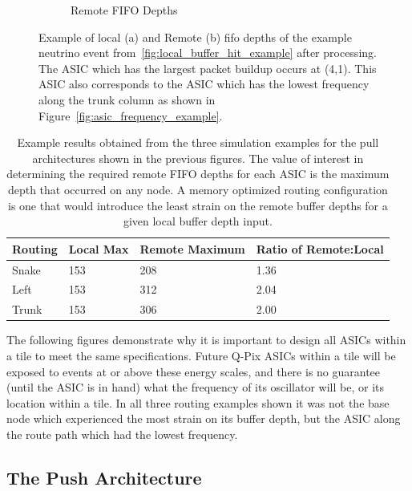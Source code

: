 \begin{figure}
\begin{subfigure}{.5\textwidth}
  \caption{Remote FIFO Depths}
\end{subfigure}
\caption{Example of local (a) and Remote (b) fifo depths of the example neutrino event from~\ref{fig:local_buffer_hit_example} after processing.
The ASIC which has the largest packet buildup occurs at (4,1).
This ASIC also corresponds to the ASIC which has the lowest frequency along the trunk column as shown in Figure~\ref{fig:asic_frequency_example}.
}
\label{fig:trunk_example_neutrino}
\end{figure}


\begin{table}
\begin{center}
\begin{tabular}{|| p{20mm} | p{40mm} | p{40mm} | p{45mm} ||}
 \hline
 Routing & Local Max & Remote Maximum & Ratio of Remote:Local \\ [0.5ex]
 \hline\hline
  Snake & 153 & 208 & 1.36 \\
 \hline
  Left & 153 & 312 & 2.04 \\
 \hline
  Trunk & 153 & 306 & 2.00 \\
 \hline
 \hline
\end{tabular}
\caption{Example results obtained from the three simulation examples for the pull architectures shown in the previous figures.
The value of interest in determining the required remote FIFO depths for each ASIC is the maximum depth that occurred on any node.
A memory optimized routing configuration is one that would introduce the least strain on the remote buffer depths for a given local buffer depth input.
}
\label{table:example_analysis}
\end{center}
\end{table}

The following figures demonstrate why it is important to design all ASICs within a tile to meet the same specifications.
Future Q-Pix ASICs within a tile will be exposed to events at or above these energy scales, and there is no guarantee (until the ASIC is in hand) what the frequency of its oscillator will be, or its location within a tile. 
In all three routing examples shown it was not the base node which experienced the most strain on its buffer depth, but the ASIC along the route path which had the lowest frequency.


\subsection{The Push Architecture}

